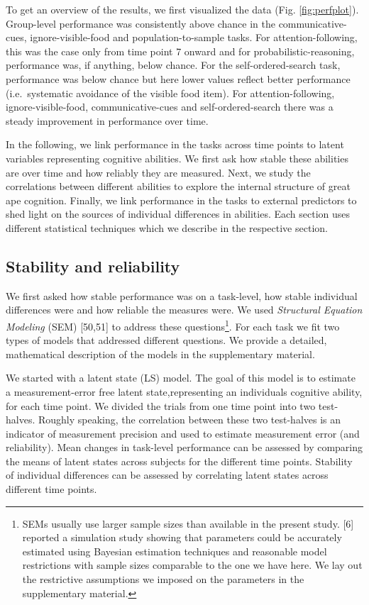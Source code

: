 \documentclass[
  man,floatsintext]{apa6}
\begin{document}
To get an overview of the results, we first visualized the data (Fig. \ref{fig:perfplot}). Group-level performance was consistently above chance in the communicative-cues, ignore-visible-food and population-to-sample tasks. For attention-following, this was the case only from time point 7 onward and for probabilistic-reasoning, performance was, if anything, below chance. For the self-ordered-search task, performance was below chance but here lower values reflect better performance (i.e.~systematic avoidance of the visible food item). For attention-following, ignore-visible-food, communicative-cues and self-ordered-search there was a steady improvement in performance over time.

In the following, we link performance in the tasks across time points to latent variables representing cognitive abilities. We first ask how stable these abilities are over time and how reliably they are measured. Next, we study the correlations between different abilities to explore the internal structure of great ape cognition. Finally, we link performance in the tasks to external predictors to shed light on the sources of individual differences in abilities. Each section uses different statistical techniques which we describe in the respective section.

\subsection{Stability and reliability}\label{stability-and-reliability}

We first asked how stable performance was on a task-level, how stable individual differences were and how reliable the measures were. We used \emph{Structural Equation Modeling} (SEM) {[}50,51{]} to address these questions\footnote{SEMs usually use larger sample sizes than available in the present study. {[}6{]} reported a simulation study showing that parameters could be accurately estimated using Bayesian estimation techniques and reasonable model restrictions with sample sizes comparable to the one we have here. We lay out the restrictive assumptions we imposed on the parameters in the supplementary material.}. For each task we fit two types of models that addressed different questions. We provide a detailed, mathematical description of the models in the supplementary material.

We started with a latent state (LS) model. The goal of this model is to estimate a measurement-error free latent state,representing an individuals cognitive ability, for each time point. We divided the trials from one time point into two test-halves. Roughly speaking, the correlation between these two test-halves is an indicator of measurement precision and used to estimate measurement error (and reliability). Mean changes in task-level performance can be assessed by comparing the means of latent states across subjects for the different time points. Stability of individual differences can be assessed by correlating latent states across different time points.
\end{document}
